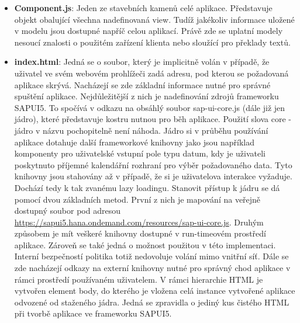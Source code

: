 \documentclass[thesis=M,czech]{FITthesis}[2012/06/26]
\begin{document}
\begin{itemize}
	\item
	\textbf{Component.js}: Jeden ze stavebních kamenů celé aplikace. Představuje objekt obalující všechna nadefinovaná view. Tudíž jakékoliv informace uložené v modelu jsou dostupné napříč celou aplikací. Právě zde se uplatní modely nesoucí znalosti o použitém zařízení klienta nebo sloužící pro překlady textů.
	\item
	\textbf{index.html}: Jedná se o soubor, který je implicitně volán v případě, že uživatel ve svém webovém prohlížeči zadá adresu, pod kterou se požadovaná aplikace skrývá. Nacházejí se zde základní informace nutné pro správné spuštění aplikace. Nejdůležitější z nich je nadefinování zdrojů frameworku SAPUI5. To spočívá v odkazu na obsáhlý soubor sap-ui-core.js (dále již jen jádro), které představuje kostru nutnou pro běh aplikace. Použití slova core - jádro v názvu pochopitelně není náhoda. Jádro si v průběhu používání aplikace dotahuje další frameworkové knihovny jako jsou například komponenty pro uživatelské vstupní pole typu datum, kdy je uživateli poskytnuto příjemné kalendářní rozhraní pro výběr požadovaného data. Tyto knihovny jsou stahovány až v případě, že si je uživatelova interakce vyžaduje. Dochází tedy k tak zvanému lazy loadingu. Stanovit přístup k jádru se dá pomocí dvou základních metod. První z nich je mapování na veřejně dostupný soubor pod adresou \url{https://sapui5.hana.ondemand.com/resources/sap-ui-core.js}. Druhým způsobem je mít veškeré knihovny dostupné v run-timeovém prostředí aplikace. Zároveň se také jedná o možnost použitou v této implementaci. Interní bezpečností politika totiž nedovoluje volání mimo vnitřní síť. Dále se zde nacházejí odkazy na externí knihovny nutné pro správný chod aplikace v rámci prostředí používaném uživatelem. V rámci hierarchie HTML je vytvořen element body, do kterého je vložena celá instance vytvořené aplikace odvozené od staženého jádra. Jedná se zpravidla o jediný kus čistého HTML při tvorbě aplikace ve frameworku SAPUI5.

\end{itemize}
\end{document}
